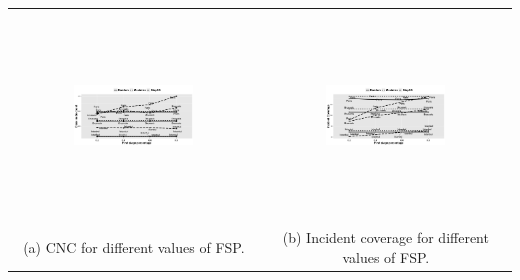 \documentclass{acm_proc_article-sp}
\begin{document}
\begin{table}[!htb]
\centering
\begin{tabular}{cc}
   \includegraphics[width=0.5\textwidth, height=5.5cm]{figuresPng/hollaCloseCnt.png} &  \includegraphics[width=0.5\textwidth, height=5.5cm]{figuresPng/citiesInc.png}\\
   (a) CNC for different values of FSP. & (b) Incident coverage for different values of FSP.\\
\end{tabular}
\label{fig:hollaResults}
\end{table}
\end{document}
